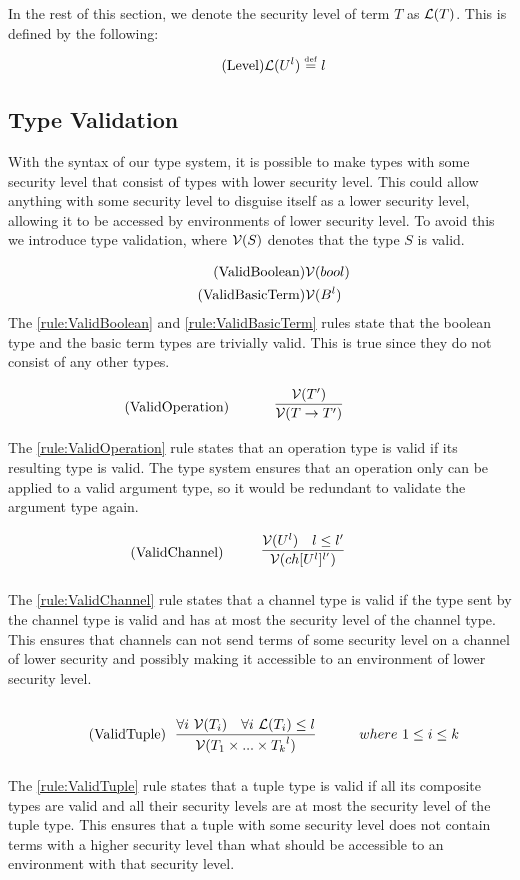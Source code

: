 In the rest of this section, we denote the security level of term $T$ as $\mathcal{L}(T)$.
This is defined by the following:
\begin{align*}
    \tag{Level}\mathcal{L}(U^l)\overset{\underset{\mathrm{def}}{}}{=} l
\end{align*}

\subsection{Type Validation}
With the syntax of our type system, it is possible to make types with some security level that consist of types with lower security level.
This could allow anything with some security level to disguise itself as a lower security level, allowing it to be accessed by environments of lower security level.
To avoid this we introduce type validation, where $\mathcal{V}(S)$ denotes that the type $S$ is valid.

\begin{align*}
    \tag{ValidBoolean}\label{rule:ValidBoolean} &\mathcal{V}(bool)\\
    \tag{ValidBasicTerm}\label{rule:ValidBasicTerm} &\mathcal{V}(B^l)
\end{align*}
The \ref{rule:ValidBoolean} and \ref{rule:ValidBasicTerm} rules state that the boolean type and the basic term types are trivially valid.
This is true since they do not consist of any other types.

\begin{align*}
    \tag{ValidOperation}\label{rule:ValidOperation} &\infrule{\valid{T'}}{\valid{T\ra T'}}
\end{align*}
The \ref{rule:ValidOperation} rule states that an operation type is valid if its resulting type is valid.
The type system ensures that an operation only can be applied to a valid argument type, so it would be redundant to validate the argument type again.

\begin{align*}
    \tag{ValidChannel}\label{rule:ValidChannel} &\infrule{\valid{U^l}\quad l\leq l'}{\valid{ch[U^l]^{l'}}}
\end{align*}

The \ref{rule:ValidChannel} rule states that a channel type is valid if the type sent by the channel type is valid and has at most the security level of the channel type.
This ensures that channels can not send terms of some security level on a channel of lower security and possibly making it accessible to an environment of lower security level.

\begin{align*}
    \tag{ValidTuple}\label{rule:ValidTuple} &\infrule{\forall i\ \valid{T_i}\quad \forall i\ \level{T_i}\leq l}{\valid{{T_1 \times...\times T_k}^l}}& where\ 1\leq i\leq k
\end{align*}
The \ref{rule:ValidTuple} rule states that a tuple type is valid if all its composite types are valid and all their security levels are at most the security level of the tuple type.
This ensures that a tuple with some security level does not contain terms with a higher security level than what should be accessible to an environment with that security level.

